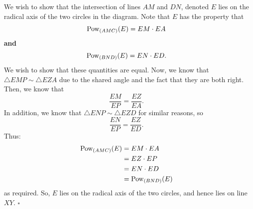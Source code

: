 \documentclass{article}
\begin{document}
We wish to show that the intersection of lines $AM$ and $DN$, denoted $E$ lies on the radical axis of the two circles in the diagram. Note that $E$ has the property that \[\text{Pow}_{(AMC)}(E) = EM\cdot EA\] \textbf{and} \[\text{Pow}_{(BND)}(E) = EN\cdot ED.\] We wish to show that these quantities are equal. Now, we know that $\triangle EMP \sim \triangle EZA$ due to the shared angle and the fact that they are both right. Then, we know that \[\dfrac{EM}{EP}=\dfrac{EZ}{EA}.\] In addition, we know that $\triangle ENP \sim \triangle EZD$ for similar reasons, so \[\dfrac{EN}{EP} = \dfrac{EZ}{ED}.\] Thus:
\begin{align*}
\text{Pow}_{(AMC)}(E) &= EM\cdot EA\\
&= EZ\cdot EP \\
&= EN\cdot ED \\
&= \text{Pow}_{(BND)}(E)
\end{align*}
as required. So, $E$ lies on the radical axis of the two circles, and hence lies on line $XY$. $\square$
\end{document}
